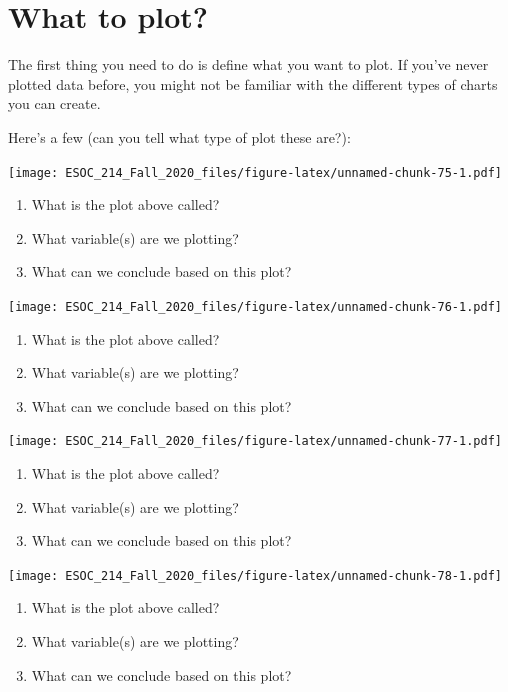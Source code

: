 \documentclass[
]{book}
\begin{document}
\hypertarget{what-to-plot}{%
\section{What to plot?}\label{what-to-plot}}

The first thing you need to do is define what you want to plot. If you've never plotted data before, you might not be familiar with the different types of charts you can create.

Here's a few (can you tell what type of plot these are?):

\texttt{[image: ESOC\_214\_Fall\_2020\_files/figure-latex/unnamed-chunk-75-1.pdf]}

\begin{enumerate}
\def\labelenumi{\arabic{enumi})}
\item
  What is the plot above called?
\item
  What variable(s) are we plotting?
\item
  What can we conclude based on this plot?
\end{enumerate}

\texttt{[image: ESOC\_214\_Fall\_2020\_files/figure-latex/unnamed-chunk-76-1.pdf]}

\begin{enumerate}
\def\labelenumi{\arabic{enumi})}
\item
  What is the plot above called?
\item
  What variable(s) are we plotting?
\item
  What can we conclude based on this plot?
\end{enumerate}

\texttt{[image: ESOC\_214\_Fall\_2020\_files/figure-latex/unnamed-chunk-77-1.pdf]}

\begin{enumerate}
\def\labelenumi{\arabic{enumi})}
\item
  What is the plot above called?
\item
  What variable(s) are we plotting?
\item
  What can we conclude based on this plot?
\end{enumerate}

\texttt{[image: ESOC\_214\_Fall\_2020\_files/figure-latex/unnamed-chunk-78-1.pdf]}

\begin{enumerate}
\def\labelenumi{\arabic{enumi})}
\item
  What is the plot above called?
\item
  What variable(s) are we plotting?
\item
  What can we conclude based on this plot?
\end{enumerate}
\end{document}
